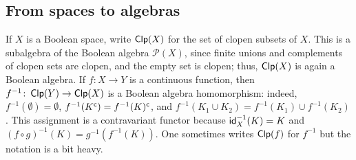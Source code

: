 \documentclass[a4paper]{article}
\begin{document}
\subsection{From spaces to algebras}
If $X$ is a Boolean space, write $\operatorname*{\mathsf{Clp}}(X)$ for the set of clopen
subsets of $X$. This is a subalgebra of the Boolean algebra $\mathcal{P}(X)$, since
finite unions and complements of clopen sets are clopen, and the empty set is
clopen; thus, $\operatorname*{\mathsf{Clp}}(X)$ is again a Boolean algebra. If $f \colon X \to Y$ is a
continuous function, then $f^{-1} \colon \operatorname*{\mathsf{Clp}}(Y) \to \operatorname*{\mathsf{Clp}}(X)$ is a Boolean
algebra homomorphism: indeed, $f^{-1}(\emptyset) = \emptyset$, $f^{-1}(K^{\mathsf{c}}) =
f^{-1}(K)^{\mathsf{c}}$, and $f^{-1}(K_1 \cup K_2) = f^{-1}(K_1) \cup f^{-1}(K_2)$. This
assignment is a contravariant functor because $\mathsf{id}_X^{-1}(K) = K$ and $(f
\circ g)^{-1}(K) = g^{-1}(f^{-1}(K))$. One sometimes writes $\operatorname*{\mathsf{Clp}}(f)$ for
$f^{-1}$ but the notation is a bit heavy.
\end{document}
